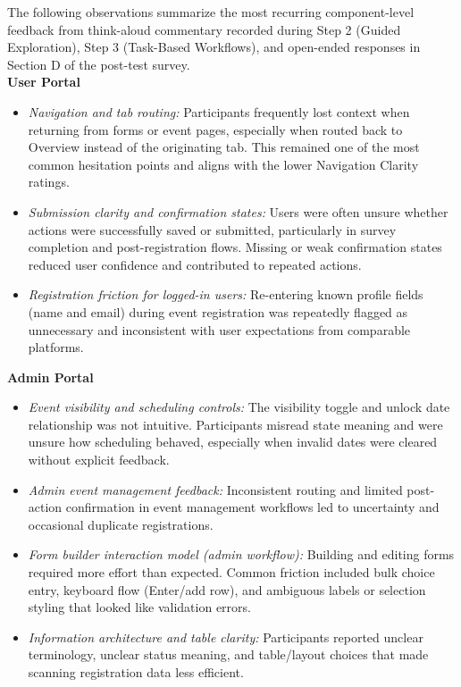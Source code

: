 \documentclass[12pt]{article}
\begin{document}
The following observations summarize the most recurring component-level feedback from think-aloud commentary recorded during Step 2 (Guided Exploration), Step 3 (Task-Based Workflows), and open-ended responses in Section D of the post-test survey.\\
\textbf{User Portal}
\begin{itemize}
    \item \textit{Navigation and tab routing:} Participants frequently lost context when returning from forms or event pages, especially when routed back to Overview instead of the originating tab. This remained one of the most common hesitation points and aligns with the lower Navigation Clarity ratings.

    \item \textit{Submission clarity and confirmation states:} Users were often unsure whether actions were successfully saved or submitted, particularly in survey completion and post-registration flows. Missing or weak confirmation states reduced user confidence and contributed to repeated actions.

    \item \textit{Registration friction for logged-in users:} Re-entering known profile fields (name and email) during event registration was repeatedly flagged as unnecessary and inconsistent with user expectations from comparable platforms.
\end{itemize}

\textbf{Admin Portal}
\begin{itemize}
    \item \textit{Event visibility and scheduling controls:} The visibility toggle and unlock date relationship was not intuitive. Participants misread state meaning and were unsure how scheduling behaved, especially when invalid dates were cleared without explicit feedback.

    \item \textit{Admin event management feedback:} Inconsistent routing and limited post-action confirmation in event management workflows led to uncertainty and occasional duplicate registrations.

    \item \textit{Form builder interaction model (admin workflow):} Building and editing forms required more effort than expected. Common friction included bulk choice entry, keyboard flow (Enter/add row), and ambiguous labels or selection styling that looked like validation errors.

    \item \textit{Information architecture and table clarity:} Participants reported unclear terminology, unclear status meaning, and table/layout choices that made scanning registration data less efficient.
\end{itemize}
\end{document}
